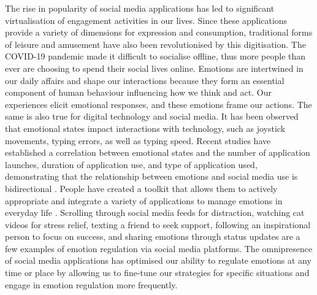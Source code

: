 \documentclass[lettersize,journal]{IEEEtran}
\begin{document}
The rise in popularity of social media applications has led to significant virtualisation of engagement activities in our lives. Since these applications provide a variety of dimensions for expression and consumption, traditional forms of leisure and amusement have also been revolutionised by this digitisation. The COVID-19 pandemic made it difficult to socialise offline, thus more people than ever are choosing to spend their social lives online. Emotions are intertwined in our daily affairs and shape our interactions because they form an essential component of human behaviour influencing how we think and act. Our experiences elicit emotional responses, and these emotions frame our actions. The same is also true for digital technology and social media. It has been observed that emotional states impact interactions with technology, such as joystick movements, typing errors, as well as typing speed. Recent studies have established a correlation between emotional states and the number of application launches, duration of application use, and type of application used, demonstrating that the relationship between emotions and social media use is bidirectional \cite{sarsenbayeva2020does}. People have created a toolkit that allows them to actively appropriate and integrate a variety of applications to manage emotions in everyday life \cite{smith2022digital}. Scrolling through social media feeds for distraction, watching cat videos for stress relief, texting a friend to seek support, following an inspirational person to focus on success, and sharing emotions through status updates are a few examples of emotion regulation via social media platforms. The omnipresence of social media applications has optimised our ability to regulate emotions at any time or place by allowing us to fine-tune our strategies for specific situations and engage in emotion regulation more frequently.
\end{document}
